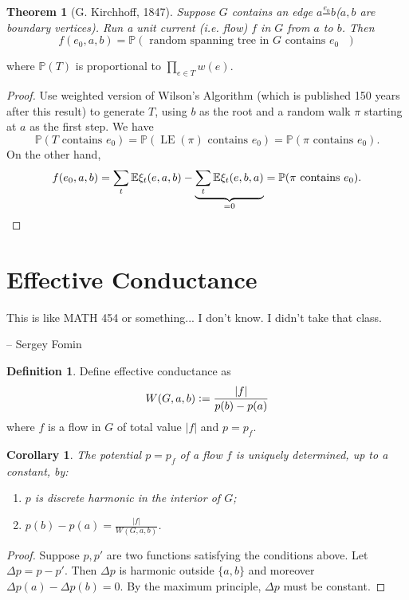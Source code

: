 \documentclass{report}
\newcommand{\matP}{\mathbb{P}}
\newcommand{\matE}{\mathbb{E}}
\def \LE {\operatorname{LE}}
\newcommand{\defeq}{\vcentcolon=}
\newtheorem{theorem}{Theorem}[section]
\newtheorem{corollary}{Corollary}[section]
\theoremstyle{definition}
\newtheorem{definition}{Definition}[section]
\theoremstyle{remark}
\numberwithin{equation}{section}
\begin{document}


\begin{theorem}[G. Kirchhoff, 1847]
    Suppose $G$ contains an edge $a \frac{e_0}{} b$($a, b$ are boundary vertices). Run a unit current (i.e. flow) $f$ in $G$ from $a$ to $b$. Then \[f(e_0, a, b) = \matP\left(\text{ random spanning tree in $G$ contains $e_0$ }\right)\]
\end{theorem} where $\matP(T)$ is proportional to $\prod_{e \in T} w(e)$.



\begin{proof}
    Use weighted version of Wilson's Algorithm (which is published 150 years after this result) to generate $T$, using $b$ as the root and a random walk $\pi$ starting at $a$ as the first step. We have
    \[
        \matP(T \text{ contains } e_0) = \matP(\LE(\pi) \text{ contains } e_0) = \matP(\pi \text{ contains } e_0).
    \] On the other hand,
    \[
        f(e_0, a, b) = \sum_t \matE\xi_t(e, a, b) - \underbrace{\sum_t \matE\xi_t(e, b, a)}_{= 0} = \matP(\pi \text{ contains } e_0). \qedhere
    \]
\end{proof}

\section{Effective Conductance}
\epigraph{This is like MATH 454 or something... I don't know. I didn't take that class.}{-- \textup{Sergey Fomin}}
\begin{definition}
    Define effective conductance as
    \[
    W(G, a, b) \defeq \frac{|f|}{p(b) - p(a)}    
    \] where $f$ is a flow in $G$ of total value $|f|$ and $p = p_f$.
\end{definition}

\begin{corollary}
    The potential $p = p_f$ of a flow $f$ is uniquely determined, up to a constant, by:
    \begin{enumerate}
        \item $p$ is discrete harmonic in the interior of $G$;
        \item $\displaystyle p(b) - p(a) = \frac{|f|}{W(G, a, b)}$.
    \end{enumerate}
\end{corollary}
\begin{proof}
    Suppose $p, p'$ are two functions satisfying the conditions above. Let $\Delta p = p - p'$. Then $\Delta p$ is harmonic outside $\{a, b\}$ and moreover $\Delta p(a) - \Delta p(b) = 0$. By the maximum principle, $\Delta p$ must be constant.
\end{proof}
\end{document}
